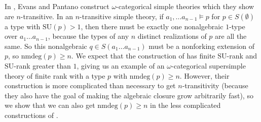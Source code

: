 \documentclass[11pt]{amsart}
\newcommand{\sidebar}[1]{\vskip10pt\noindent
 \hskip.70truein\vrule width2.0pt\hskip.5em
 \vbox{\hsize= 4truein\noindent\footnotesize\relax #1 }\vskip10pt\noindent}
\theoremstyle{definition}
\theoremstyle{remark}
\numberwithin{equation}{section}
\begin{document}
%
%
%
%
%
%
%
%

In \cite{EP02}, Evans and Pantano construct $\omega$-categorical simple
theories which they show are $n$-transitive. In an $n$-transitive simple
theory, if $a_{1}, \ldots a_{n-1} \models p$ for $p \in S(\emptyset)$ a type
with $\mathrm{SU}(p) > 1$, then there must be exactly one nonalgebraic $1$-type
over $a_{1} \ldots a_{n-1}$, because the types of any $n$ distinct
realizations of $p$ are all the same. So this nonalgebraic $q \in S(a_{1}
\ldots a_{n-1})$ must be a nonforking extension of $p$, so $\mathrm{nmdeg}(p)
\geq n$. We expect that the construction of \cite{EP02} has finite
$\mathrm{SU}$-rank and $\mathrm{SU}$-rank greater than $1$, giving us an
example of an $\omega$-categorical supersimple theory of finite rank with a
type $p$ with $\mathrm{nmdeg}(p) \geq n$. However, their construction is more
complicated than necessary to get $n$-transitivity (because they also have
the goal of making the algebraic closure grow arbitrarily fast), so we show
that we can also get $\mathrm{nmdeg}(p) \geq n$ in the less complicated
constructions of  \cite{Ev02}.
\end{document}

